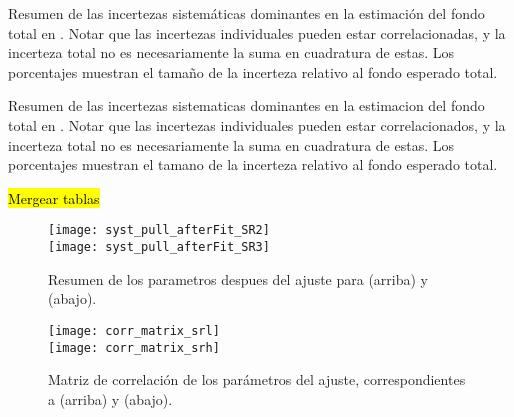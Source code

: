 

\begin{table}[!htbp]
  \centering

  \caption{Resumen de las incertezas sistemáticas dominantes en la estimación del fondo total
    en {\SRL}. Notar que las incertezas individuales pueden estar correlacionadas, y la incerteza
    total no es necesariamente la suma en cuadratura de estas. Los porcentajes muestran el tamaño
    de la incerteza relativo al fondo esperado total.}
  \label{tab:fit_result_srl_syst}

  
\end{table}

\begin{table}[!htbp]
  \centering

  \caption{Resumen de las incertezas sistematicas dominantes en la estimacion del fondo total
    en {\SRH}. Notar que las incertezas individuales pueden estar correlacionados, y la incerteza
    total no es necesariamente la suma en cuadratura de estas. Los porcentajes muestran el tamano
    de la incerteza relativo al fondo esperado total.}
  \label{tab:fit_result_srh_syst}

  

\end{table}

\hl{Mergear tablas}


\begin{figure}[!htbp]
  \centering

  \texttt{[image: syst\_pull\_afterFit\_SR2]} \\
  \texttt{[image: syst\_pull\_afterFit\_SR3]}

  \caption{Resumen de los parametros despues del ajuste para {\SRL} (arriba) y {\SRH} (abajo).}
  \label{fig:fit_unc_nuisance_SR}

\end{figure}

\begin{figure}[!htbp]
  \centering

  \texttt{[image: corr\_matrix\_srl]} \\
  \texttt{[image: corr\_matrix\_srh]} \\

  \caption{Matriz de correlación de los parámetros del ajuste, correspondientes a {\SRL} (arriba) y {\SRH} (abajo).}
  \label{fig:fit_corr_SR}

\end{figure}



